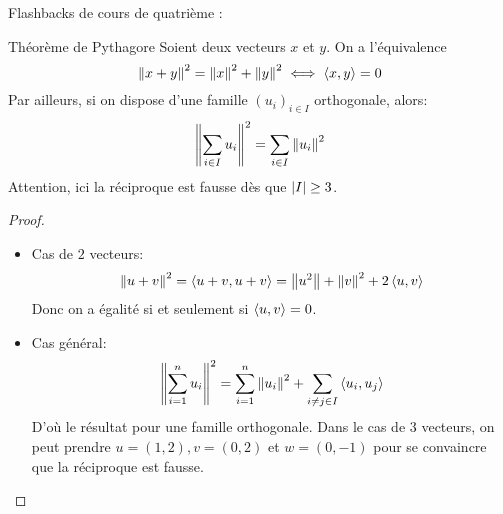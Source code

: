 \documentclass{classe}
\begin{document}
Flashbacks de cours de quatrième :

\begin{théorème}{Théorème de Pythagore}{}
Soient deux vecteurs $x$ et $y$. On a l'équivalence
\begin{equation*}
	\left\lVert x + y \right\rVert^{2} = \left\lVert x \right\rVert^{2} + \left\lVert y \right\rVert^{2} \iff \left\langle x, y \right\rangle = 0
\end{equation*}
Par ailleurs, si on dispose d'une famille $\left(u_{i}\right)_{i\in I}$ orthogonale, alors:
\begin{equation*}
	\left\lVert \sum_{i \in I}u_{i} \right\rVert^{2} = \sum_{i\in I}\left\lVert u_{i} \right\rVert^{2}
\end{equation*}
Attention, ici la réciproque est fausse dès que $\left|I\right| \geq 3$.
\end{théorème}
\begin{proof}
	\begin{itemize}
		\item Cas de $2$ vecteurs:
			\begin{equation*}
				\left\lVert u + v \right\rVert^{2} = \left\langle u + v, u + v \right\rangle = \left\lVert u^{2} \right\rVert + \left\lVert v \right\rVert^{2} + 2\left\langle u, v \right\rangle
			\end{equation*}
			Donc on a égalité si et seulement si $\left\langle u, v \right\rangle = 0$.
		\item Cas général:
			\begin{equation*}
				\left\lVert \sum_{i = 1}^{n} u_{i} \right\rVert^{2} = \sum_{i = 1}^{n}\left\lVert u_{i} \right\rVert^{2} + \sum_{i \neq j \in I}\left\langle u_{i}, u_{j} \right\rangle
			\end{equation*}
			D'où le résultat pour une famille orthogonale.
			Dans le cas de $3$ vecteurs, on peut prendre $u = \left( 1, 2 \right), v=\left( 0, 2 \right)$ et $w = \left( 0, -1 \right)$ pour se convaincre que la réciproque est fausse.
	\end{itemize}
\end{proof}
\end{document}
